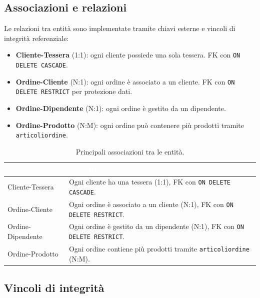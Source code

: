 \documentclass[a4paper,12pt]{article}
\renewcommand{\arraystretch}{1.2} %
\begin{document}
\subsection{Associazioni e relazioni}

Le relazioni tra entità sono implementate tramite chiavi esterne e vincoli di integrità referenziale:

\begin{itemize}
    \item \textbf{Cliente-Tessera} (1:1): ogni cliente possiede una sola tessera. FK con \texttt{ON DELETE CASCADE}.
    \item \textbf{Ordine-Cliente} (N:1): ogni ordine è associato a un cliente. FK con \texttt{ON DELETE RESTRICT} per protezione dati.
    \item \textbf{Ordine-Dipendente} (N:1): ogni ordine è gestito da un dipendente.
    \item \textbf{Ordine-Prodotto} (N:M): ogni ordine può contenere più prodotti tramite \texttt{articoliordine}.
\end{itemize}

\vspace{0.5em}
\renewcommand{\arraystretch}{1.3}
\begin{table}[htbp]
\centering
\setlength{\tabcolsep}{8pt}
\begin{tabular}{|>{\centering\arraybackslash}m{3.5cm}|>{\raggedright\arraybackslash}m{9.5cm}|}
\hline
\rowcolor{myblue}\textcolor{white}{\textbf{Associazione}} & \textcolor{white}{\textbf{Descrizione}} \\
\hline
\rowcolor{mygray} Cliente-Tessera & Ogni cliente ha una tessera (1:1), FK con \texttt{ON DELETE CASCADE}. \\
Ordine-Cliente & Ogni ordine è associato a un cliente (N:1), FK con \texttt{ON DELETE RESTRICT}. \\
\rowcolor{mygray} Ordine-Dipendente & Ogni ordine è gestito da un dipendente (N:1), FK con \texttt{ON DELETE RESTRICT}. \\
Ordine-Prodotto & Ogni ordine contiene più prodotti tramite \texttt{articoliordine} (N:M). \\
\hline
\end{tabular}
\caption{Principali associazioni tra le entità.}
\end{table}

\subsection{Vincoli di integrità}
\end{document}
